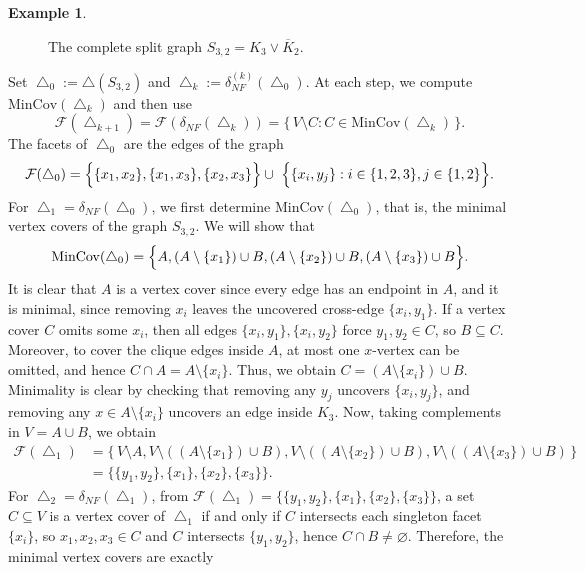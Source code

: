 \documentclass[12pt]{article}
\theoremstyle{plain}
\theoremstyle{definition}
\newtheorem{example}[theorem]{Example}
\newcommand{\MIN}{\mathrm{MinCov}}
\begin{document}
\begin{example}
\begin{figure}[h]
			\caption{The complete split graph \(S_{3,2}=K_3\vee\overline{K}_2\).}
			\label{fig:S32}
		\end{figure}
		 \noindent Set \(\bigtriangleup_0:=\bigtriangleup(S_{3,2})\) and \(\bigtriangleup_k:=\delta_{NF}^{(k)}(\bigtriangleup_0)\).
		At each step, we compute \(\MIN(\bigtriangleup_k)\) and then use
		\[
		\mathcal{F}(\bigtriangleup_{k+1})
		=\mathcal{F}(\delta_{NF}(\bigtriangleup_k))
		=\{\,V\setminus C: C\in\MIN(\bigtriangleup_k)\,\}.
		\]
		 The facets of \(\bigtriangleup_0\) are the edges of the graph
		\[
		\mathcal{F}(\bigtriangleup_0)
		=
		\Bigl\{\{x_1,x_2\},\{x_1,x_3\},\{x_2,x_3\}\Bigr\}
		 \cup\
		\Bigl\{\{x_i,y_j\}: i\in\{1,2,3\}, j\in\{1,2\}\Bigr\}.
		\]
		For \(\bigtriangleup_1=\delta_{NF}(\bigtriangleup_0)\), we first determine \(\MIN(\bigtriangleup_0)\), that is, the minimal vertex covers of the graph \(S_{3,2}\).
		We will show that
		\[
		\MIN(\bigtriangleup_0)
		=
		\Bigl\{
		A, (A\setminus\{x_1\})\cup B, (A\setminus\{x_2\})\cup B, (A\setminus\{x_3\})\cup B
		\Bigr\}.
		\]
		It is clear that  \(A\) is a vertex cover since every edge has an endpoint in \(A\), and it is minimal, since removing \(x_i\)
			leaves the uncovered cross-edge \(\{x_i,y_1\}\).   If a vertex cover \(C\) omits some \(x_i\), then all edges \(\{x_i,y_1\},\{x_i,y_2\}\) force \(y_1,y_2\in C\), so \(B\subseteq C\). Moreover, to cover the clique edges inside \(A\), at most one \(x\)-vertex can be omitted, and  hence \(C\cap A=A\setminus\{x_i\}\). Thus, we obtain \(C=(A\setminus\{x_i\})\cup B\). Minimality is clear by checking that removing any \(y_j\) uncovers \(\{x_i,y_j\}\), and removing any \(x\in A\setminus\{x_i\}\) uncovers an edge inside \(K_3\).  Now, taking complements in \(V=A\cup B\), we obtain 
		\begin{align*}
		\mathcal{F}(\bigtriangleup_1)
		&=
		\{\,V\setminus A, V\setminus((A\setminus\{x_1\})\cup B), V\setminus((A\setminus\{x_2\})\cup B), V\setminus((A\setminus\{x_3\})\cup B)\,\}\\
		&=
		\bigl\{\{y_1,y_2\},\{x_1\},\{x_2\},\{x_3\}\bigr\}.
		\end{align*}
		For \(\bigtriangleup_2=\delta_{NF}(\bigtriangleup_1)\), from \(\mathcal{F}(\bigtriangleup_1)=\{\{y_1,y_2\},\{x_1\},\{x_2\},\{x_3\}\}\), a set \(C\subseteq V\) is a vertex cover of \(\bigtriangleup_1\) if and only if \(C\) intersects each singleton facet \(\{x_i\}\), so \(x_1,x_2,x_3\in C\) and   \(C\) intersects \(\{y_1,y_2\}\), hence \(C\cap B\neq\varnothing\). Therefore, the minimal vertex covers are exactly

\end{example}
\end{document}
